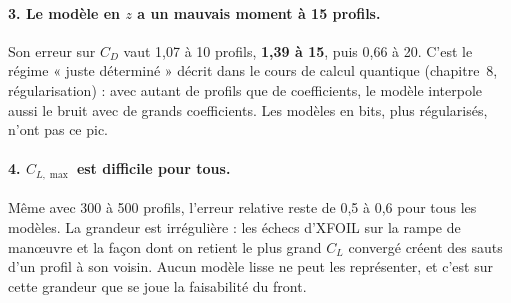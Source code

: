 \paragraph{3. Le modèle en $z$ a un mauvais moment à 15 profils.} Son erreur sur $C_D$ vaut 1,07 à 10 profils, \textbf{1,39 à 15}, puis 0,66 à 20. C'est le régime « juste déterminé » décrit dans le cours de calcul quantique (chapitre~8, régularisation) : avec autant de profils que de coefficients, le modèle interpole aussi le bruit avec de grands coefficients. Les modèles en bits, plus régularisés, n'ont pas ce pic.

\paragraph{4. $C_{L,\max}$ est difficile pour tous.} Même avec 300 à 500 profils, l'erreur relative reste de 0,5 à 0,6 pour tous les modèles. La grandeur est irrégulière : les échecs d'XFOIL sur la rampe de manœuvre et la façon dont on retient le plus grand $C_L$ convergé créent des sauts d'un profil à son voisin. Aucun modèle lisse ne peut les représenter, et c'est sur cette grandeur que se joue la faisabilité du front.

